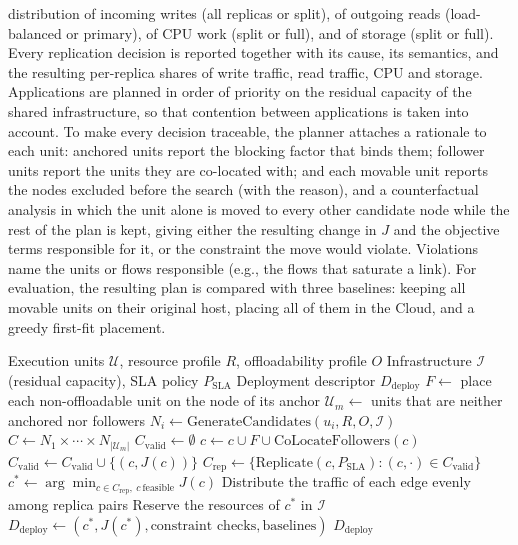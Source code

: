 distribution of incoming writes (all replicas or split), of outgoing reads
(load-balanced or primary), of CPU work (split or full), and of storage (split
or full). Every replication decision is reported together with its cause, its
semantics, and the resulting per-replica shares of write traffic, read
traffic, CPU and storage. Applications are planned in order of priority on the residual
capacity of the shared infrastructure, so that contention between applications
is taken into account. To make every decision traceable, the planner attaches a rationale to each
unit: anchored units report the blocking factor that binds them; follower units
report the units they are co-located with; and each movable unit reports the
nodes excluded before the search (with the reason), and a counterfactual
analysis in which the unit alone is moved to every other candidate node while
the rest of the plan is kept, giving either the resulting change in $J$ and
the objective terms responsible for it, or the constraint the move would
violate. Violations name the units or flows responsible (e.g., the flows that
saturate a link). For evaluation, the resulting plan is compared with
three baselines: keeping all movable units on their original host, placing all
of them in the Cloud, and a greedy first-fit placement.

\begin{algorithm}[ht]
\caption{Deployment Planner}
\label{alg:deployment_planner}
\begin{algorithmic}[1]
\Require Execution units $\mathcal{U}$, resource profile $R$, offloadability profile $O$
\Require Infrastructure $\mathcal{I}$ (residual capacity), SLA policy $P_{\mathrm{SLA}}$
\Ensure Deployment descriptor $D_{\mathrm{deploy}}$
\State $F \leftarrow$ place each non-offloadable unit on the node of its anchor
\State $\mathcal{U}_m \leftarrow$ units that are neither anchored nor followers
  \State $N_i \leftarrow \mathrm{GenerateCandidates}(u_i, R, O, \mathcal{I})$
\EndFor
\State $C \leftarrow N_1\times\cdots\times N_{|\mathcal{U}_m|}$ 
\State $C_{\mathrm{valid}} \leftarrow \emptyset$
  \State $c \leftarrow c \cup F \cup \mathrm{CoLocateFollowers}(c)$
    \State $C_{\mathrm{valid}} \leftarrow C_{\mathrm{valid}} \cup \{(c, J(c))\}$
  \EndIf
\EndFor
\State $C_{\mathrm{rep}} \leftarrow \{\mathrm{Replicate}(c, P_{\mathrm{SLA}}) : (c,\cdot)\in C_{\mathrm{valid}}\}$ 
\State $c^\ast \leftarrow \arg\min_{c\in C_{\mathrm{rep}},\ c\ \mathrm{feasible}} J(c)$
\State Distribute the traffic of each edge evenly among replica pairs
\State Reserve the resources of $c^\ast$ in $\mathcal{I}$
\State $D_{\mathrm{deploy}} \leftarrow (c^\ast, J(c^\ast), \text{constraint checks}, \text{baselines})$
\State \Return $D_{\mathrm{deploy}}$
\end{algorithmic}
\end{algorithm}
